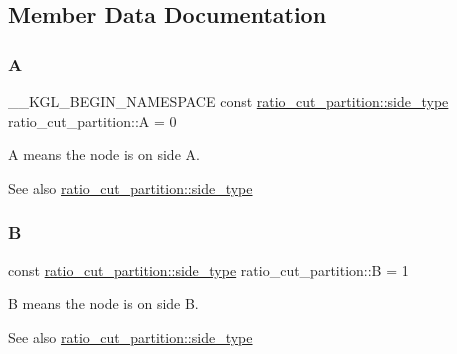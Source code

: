 \subsection{Member Data Documentation}
\mbox{\label{classratio__cut__partition_ae1a3cd1c2ede82023f9a229e40909139}} 
\subsubsection{\texorpdfstring{A}{A}}
{\footnotesize\ttfamily \+\_\+\+\_\+\+K\+G\+L\+\_\+\+B\+E\+G\+I\+N\+\_\+\+N\+A\+M\+E\+S\+P\+A\+CE const \mbox{\hyperlink{classratio__cut__partition_ace53442bd0c1e21fbf00858ec6f6b456}{ratio\+\_\+cut\+\_\+partition\+::side\+\_\+type}} ratio\+\_\+cut\+\_\+partition\+::A = 0\hspace{0.3cm}{\ttfamily [static]}}

{\ttfamily A} means the node is on side A.

\begin{DoxySeeAlso}{See also}
\mbox{\hyperlink{classratio__cut__partition_ace53442bd0c1e21fbf00858ec6f6b456}{ratio\+\_\+cut\+\_\+partition\+::side\+\_\+type}} 
\end{DoxySeeAlso}
\mbox{\label{classratio__cut__partition_adf075987228d8adc7950d5b1ba332daa}} 
\subsubsection{\texorpdfstring{B}{B}}
{\footnotesize\ttfamily const \mbox{\hyperlink{classratio__cut__partition_ace53442bd0c1e21fbf00858ec6f6b456}{ratio\+\_\+cut\+\_\+partition\+::side\+\_\+type}} ratio\+\_\+cut\+\_\+partition\+::B = 1\hspace{0.3cm}{\ttfamily [static]}}

{\ttfamily B} means the node is on side B.

\begin{DoxySeeAlso}{See also}
\mbox{\hyperlink{classratio__cut__partition_ace53442bd0c1e21fbf00858ec6f6b456}{ratio\+\_\+cut\+\_\+partition\+::side\+\_\+type}} 
\end{DoxySeeAlso}
\mbox{\label{classratio__cut__partition_a2fe155c63de19dc08c16bcb382f0dcbc}} 
